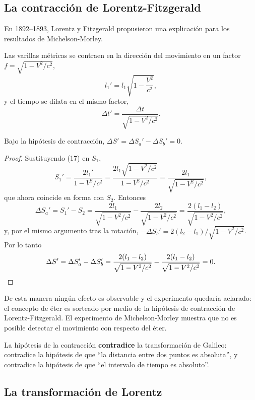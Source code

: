 \subsection{La contracción de Lorentz-Fitzgerald}

En 1892--1893, Lorentz y Fitzgerald propusieron una explicación para los
resultados de Michelson-Morley.

\begin{definicion}
Las varillas métricas se contraen en la dirección del movimiento en un
factor $f=\sqrt{1-V^2/c^2}$,
\[
l_1' = l_1\sqrt{1-\frac{V^2}{c^2}}, \tag{17}
\]
y el tiempo se dilata en el mismo factor,
\[
\Delta t' = \frac{\Delta t}{\sqrt{1-V^2/c^2}} . \tag{18}
\]
\end{definicion}

\begin{proposicionc}
Bajo la hipótesis de contracción, $\Delta S' = \Delta S_a'-\Delta
S_b' = 0$.
\end{proposicionc}

\begin{proof}
Sustituyendo (17) en $S_1$,
\[
S_1' = \frac{2l_1'}{1-V^2/c^2} = \frac{2l_1\sqrt{1-V^2/c^2}}{1-V^2/c^2}
= \frac{2l_1}{\sqrt{1-V^2/c^2}},
\]
que ahora coincide en forma con $S_2$. Entonces
\[
\Delta S_a' = S_1'-S_2 = \frac{2l_1}{\sqrt{1-V^2/c^2}} - \frac{2l_2}
{\sqrt{1-V^2/c^2}} = \frac{2(l_1-l_2)}{\sqrt{1-V^2/c^2}},
\]
y, por el mismo argumento tras la rotación, $-\Delta S_b' =
2(l_2-l_1)/\sqrt{1-V^2/c^2}$. Por lo tanto
\[
\Delta S' = \Delta S_a'-\Delta S_b' = \frac{2(l_1-l_2)}{\sqrt{1-
V^2/c^2}} - \frac{2(l_1-l_2)}{\sqrt{1-V^2/c^2}} = 0 . \qedhere
\]
\end{proof}

De esta manera ningún efecto es observable y el experimento quedaría
aclarado: el concepto de éter es sorteado por medio de la hipótesis de
contracción de Lorentz-Fitzgerald. El experimento de Michelson-Morley
muestra que no es posible detectar el movimiento con respecto del éter.

\begin{observacion}
La hipótesis de la contracción \textbf{contradice} la transformación de
Galileo: contradice la hipótesis de que ``la distancia entre dos puntos
es absoluta'', y contradice la hipótesis de que ``el intervalo de
tiempo es absoluto''.
\end{observacion}

\subsection{La transformación de Lorentz}

